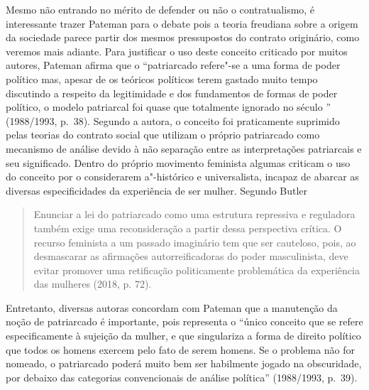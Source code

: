 Mesmo não entrando no mérito de defender ou não o contratualismo, é
interessante trazer Pateman para o debate pois a teoria freudiana
sobre a origem da sociedade parece partir dos mesmos pressupostos do
contrato originário, como veremos mais adiante. Para justificar o uso
deste conceito criticado por muitos autores, Pateman afirma que
o ``patriarcado refere"-se a uma forma de poder político
mas, apesar de os teóricos políticos terem gastado muito tempo
discutindo a respeito da legitimidade e dos fundamentos de formas de
poder político, o modelo patriarcal foi quase que totalmente ignorado no
século '' (1988/1993, p.~38). Segundo a autora, o conceito foi praticamente
suprimido pelas teorias do contrato social que utilizam o próprio
patriarcado como mecanismo de análise devido à não separação entre as
interpretações patriarcais e seu significado. Dentro do próprio
movimento feminista algumas criticam o uso do conceito por o
considerarem a"-histórico e universalista, incapaz de abarcar as diversas
especificidades da experiência de ser mulher. Segundo Butler

\begin{quote}
Enunciar a lei do patriarcado como uma estrutura repressiva e reguladora
também exige uma reconsideração a partir dessa perspectiva crítica. O
recurso feminista a um passado imaginário tem que ser cauteloso, pois,
ao desmascarar as afirmações autorreificadoras do poder masculinista,
deve evitar promover uma retificação politicamente problemática da
experiência das mulheres (2018, p. 72).
\end{quote}

Entretanto, diversas autoras concordam com Pateman que a
manutenção da noção de patriarcado é importante, pois representa o
``único conceito que se refere especificamente à sujeição da mulher, e
 que singulariza a forma de direito político que todos os homens exercem
 pelo fato de serem homens. Se o problema não for nomeado, o patriarcado
 poderá muito bem ser habilmente jogado na obscuridade, por debaixo das
 categorias convencionais de análise política'' (1988/1993, p.~39).

